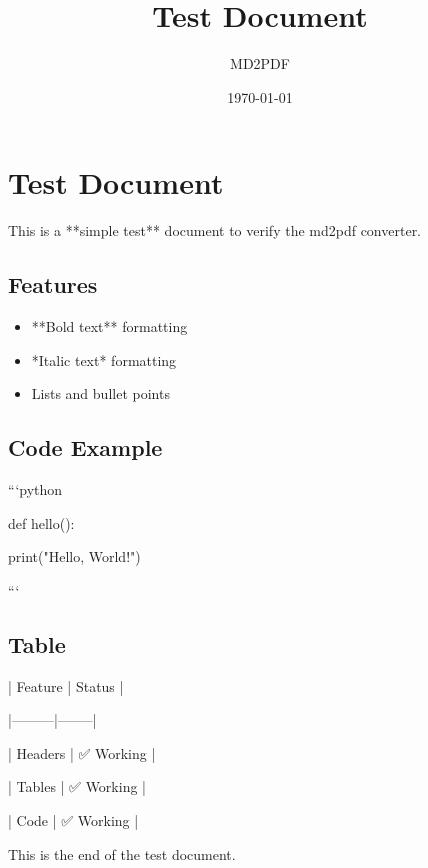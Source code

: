 \documentclass[11pt,letterpaper]{article}
\title{Test Document}
\author{MD2PDF}
\date{\today}
\begin{document}
\maketitle

\section{Test Document}


This is a **simple test** document to verify the md2pdf converter.


\subsection{Features}


\begin{itemize}\item **Bold text** formatting\end{itemize}

\begin{itemize}\item *Italic text* formatting\end{itemize}

\begin{itemize}\item Lists and bullet points\end{itemize}


\subsection{Code Example}


```python

def hello():

    print("Hello, World!")

```


\subsection{Table}


| Feature | Status |

|---------|--------|

| Headers | ✅ Working |

| Tables  | ✅ Working |

| Code    | ✅ Working |


This is the end of the test document.
\end{document}
